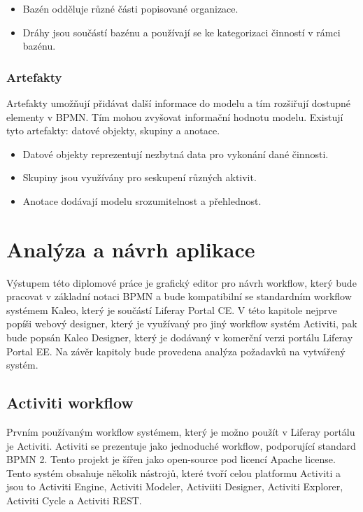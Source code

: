 \documentclass{fithesis}
\begin{document}
\begin{itemize}
\item Bazén odděluje různé části popisované organizace.
\item Dráhy jsou součástí bazénu a používají se ke kategorizaci činností v rámci bazénu.
\end{itemize}


\subsection{Artefakty}
Artefakty umožňují přidávat další informace do modelu a tím rozšiřují dostupné elementy v BPMN. Tím mohou zvyšovat informační hodnotu modelu. Existují tyto artefakty: datové objekty, skupiny a anotace.

\begin{itemize}
\item Datové objekty reprezentují nezbytná data pro vykonání dané činnosti.
\item Skupiny jsou využívány pro seskupení různých aktivit.
\item Anotace dodávají modelu srozumitelnost a přehlednost.
\end{itemize}



\chapter{Analýza a návrh aplikace}

Výstupem této diplomové práce je grafický editor pro návrh workflow, který bude pracovat v základní notaci BPMN a bude kompatibilní se standardním workflow systémem Kaleo, který je součástí Liferay Portal CE. V této kapitole nejprve popíši webový designer, který je využívaný pro jiný workflow systém Activiti, pak bude popsán Kaleo Designer, který je dodávaný v komerční verzi portálu Liferay Portal EE. Na závěr kapitoly bude provedena analýza požadavků na vytvářený systém.

\section{Activiti workflow}
Prvním používaným workflow systémem, který je možno použít v Liferay portálu je Activiti. Activiti se prezentuje jako jednoduché workflow, podporující standard BPMN 2. Tento projekt je šířen jako open-source pod licencí Apache license. Tento systém obsahuje několik nástrojů, které tvoří celou platformu Activiti a jsou to Activiti Engine, Activiti Modeler, Activiiti Designer, Activiti Explorer, Activiti Cycle a Activiti REST.
\end{document}
